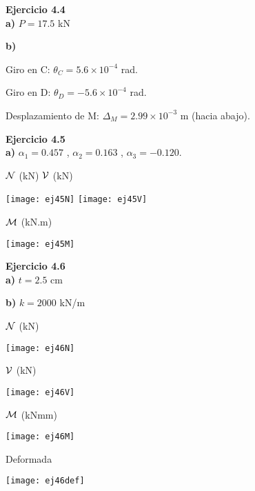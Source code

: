 \textbf{Ejercicio 4.4}\\

\textbf{a)} $P = 17.5$ kN

\textbf{b)}

Giro en C: $\theta_C = 5.6 \times 10^{-4}$ rad.

Giro en D: $\theta_D = -5.6 \times 10^{-4}$ rad.

Desplazamiento de M: $\Delta_M = 2.99 \times 10^{-3}$ m (hacia abajo).\newline


\textbf{Ejercicio 4.5}\\

\textbf{a)} $\alpha_1 = 0.457$ , $\alpha_2 = 0.163$ , $\alpha_3 = -0.120$.

${\mathcal N}$ (kN) \hspace{0.4\textwidth} ${\mathcal V}$ (kN)

\begin{center}
	\texttt{[image: ej45N]}
	\texttt{[image: ej45V]}
\end{center}

${\mathcal M}$ (kN.m)

\begin{center}
	\texttt{[image: ej45M]}
\end{center}


\textbf{Ejercicio 4.6}\\

\textbf{a)} $t = 2.5$ cm

\textbf{b)} $k = 2000$ kN/m


${\mathcal N}$ (kN)
\begin{center}
	\texttt{[image: ej46N]}
\end{center}

${\mathcal V}$ (kN)
\begin{center}
	\texttt{[image: ej46V]}
\end{center}

${\mathcal M}$ (kNmm)

\begin{center}
	\texttt{[image: ej46M]}
\end{center}


Deformada

\begin{center}
	\texttt{[image: ej46def]}
\end{center}



